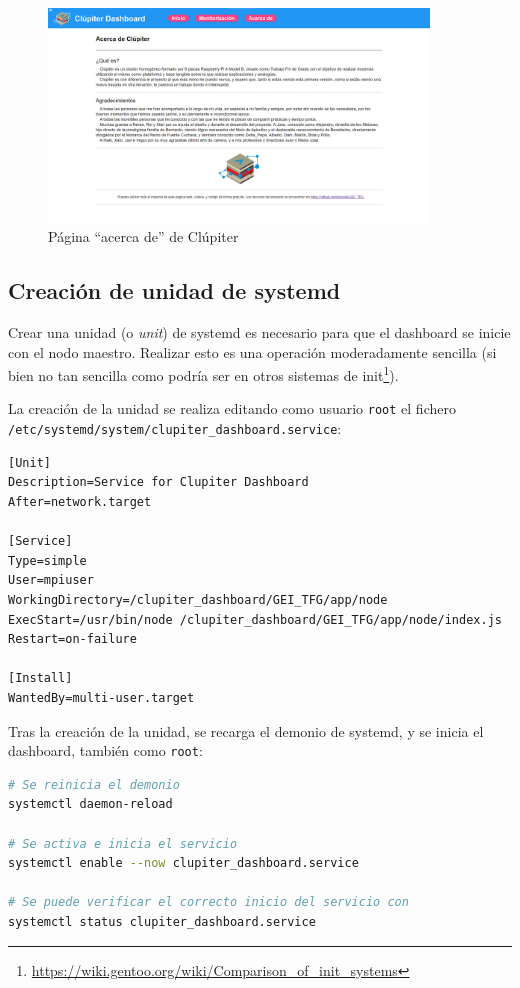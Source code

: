 \begin{figure}[h!]
  \centering
  \includegraphics[width=0.9\textwidth]{img/dashboard/agradecimientos.png}
  \caption{Página ``acerca de'' de Clúpiter}
  \label{fig:acercade_clupiter}
\end{figure}

\subsection{Creación de unidad de systemd}
Crear una unidad (o \textit{unit}) de systemd es necesario para que el dashboard se inicie con el nodo maestro. Realizar esto es una operación moderadamente sencilla (si bien no tan sencilla como podría ser en otros sistemas de init\footnote{\url{https://wiki.gentoo.org/wiki/Comparison_of_init_systems}}). 

La creación de la unidad se realiza editando como usuario \texttt{root} el fichero \texttt{/etc/systemd/system/clupiter\_dashboard.service}:

\begin{lstlisting}[]
[Unit]
Description=Service for Clupiter Dashboard
After=network.target

[Service]
Type=simple
User=mpiuser
WorkingDirectory=/clupiter_dashboard/GEI_TFG/app/node
ExecStart=/usr/bin/node /clupiter_dashboard/GEI_TFG/app/node/index.js
Restart=on-failure

[Install]
WantedBy=multi-user.target
\end{lstlisting}

Tras la creación de la unidad, se recarga el demonio de systemd, y se inicia el dashboard, también como \texttt{root}:
\begin{lstlisting}[language=bash]
# Se reinicia el demonio
systemctl daemon-reload

# Se activa e inicia el servicio
systemctl enable --now clupiter_dashboard.service

# Se puede verificar el correcto inicio del servicio con
systemctl status clupiter_dashboard.service
\end{lstlisting}

